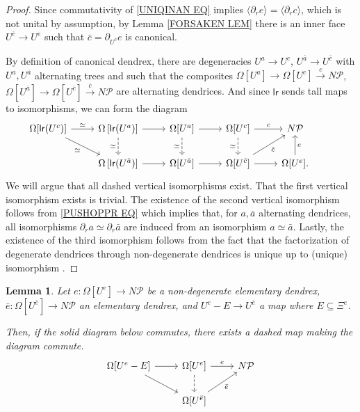 \documentclass[a4paper,10pt
,draft
]{article}%
\numberwithin{equation}{section}
\numberwithin{figure}{section}
\newtheorem{lemma}[equation]{Lemma}%
\theoremstyle{definition} %
\newcommand{\1}{\ensuremath{\mathbbm 1}}%
\begin{document}
\begin{proof}
	Since commutativity of \eqref{UNIQINAN EQ} implies
	$\langle \partial_r e \rangle =
	\langle \partial_r c \rangle$,
	which is not unital by assumption, 
	by Lemma \ref{FORSAKEN LEM} there is an inner face $U^{\bar{c}} \to U^{e}$
	such that $\bar{c} = \partial_{U^{\bar{c}}} e$ is canonical.
	
	By definition of canonical dendrex, there are
	degeneracies
	$U^a \to U^c$,
	$U^{\bar{a}} \to U^{\bar{c}}$
	with $U^a,U^{\bar{a}}$
	alternating trees
	and such that the composites 
	$\Omega[U^a] \to \Omega[U^c] \xrightarrow{c} N \mathcal{P}$,
	$\Omega[U^{\bar{a}}] \to \Omega[U^{\bar{c}}] \xrightarrow{\bar{c}} N \mathcal{P}$  
	are alternating dendrices. And since $\mathsf{lr}$ sends tall maps to isomorphisms, we can form the diagram
	\[
	\begin{tikzcd}
	\Omega[\mathsf{lr}(U^c)] \ar{r}{\simeq} \ar{rd}[swap]{\simeq} &
	\Omega\left[\mathsf{lr}(U^a)\right] \ar[dashed]{d}[swap]{\simeq} \ar{r} &
	\Omega[U^a] \ar[dashed]{d}[swap]{\simeq} \ar{r} &
	\Omega[U^c] \ar{r}{c} \ar[dashed]{d}[swap]{\simeq} &
	N \mathcal{P}
	\\
	&
	\Omega\left[\mathsf{lr}(U^{\bar{a}})\right] \ar{r} &
	\Omega[U^{\bar{a}}] \ar{r} &
	\Omega[U^{\bar{c}}] \ar{ru}[swap]{\bar c} \ar{r} &
	\Omega[U^{e}] \ar{u}[swap]{e}. &
	\end{tikzcd}
	\]
	We will argue that all dashed vertical isomorphisms exist.
	That the first vertical isomorphism exists is trivial.
	The existence of the second vertical isomorphism follows from
	\eqref{PUSHOPPR EQ} which implies that, for $a,\bar{a}$ alternating dendrices, all isomorphisms 
	$\partial_r a \simeq \partial_r \bar{a}$
	are induced from an isomorphism $a \simeq \bar{a}$.
	Lastly, the existence of the third isomorphism follows 
	from the fact that the factorization of degenerate dendrices through non-degenerate dendrices is unique up to (unique) isomorphism \cite[Prop. 5.62]{Per18}.
\end{proof}



\begin{lemma}\label{UNIQINAN2 LEM}
	Let 
	$e \colon \Omega[U^e] \to N \mathcal{P}$ 
	be a non-degenerate elementary dendrex,
	$\bar{e} \colon \Omega[U^{\bar{e}}] \to N \mathcal{P}$
	an elementary dendrex,
	and 
	$U^e-E \to U^{\bar{e}}$ a map where $E \subseteq \Xi^e$.
	
	Then, 
	if the solid diagram below commutes, there exists a dashed map making the diagram commute.
	\begin{equation}\label{UNIQINAN2 EQ}
	\begin{tikzcd}
	\Omega[U^e-E] \ar{r} \ar{rd}&
	\Omega[U^e] \ar{r}{e} \ar[dashed]{d} &
	N \mathcal{P}
	\\
	&
	\Omega[U^{\bar{e}}] \ar{ru}[swap]{\bar{e}} 
	\end{tikzcd}
	\end{equation}
\end{lemma}
\end{document}
